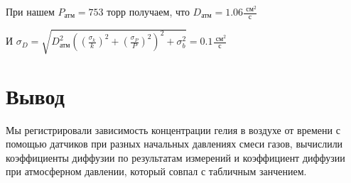 \documentclass[a4paper]{article}
\begin{document}
При нашем $P_\text{атм} = 753 \text{ торр}$ получаем, что $D_\text{атм} = 1.06 \frac{\text{ см}^2}{\text{с}}$

И $\sigma_D =\sqrt{ D_\text{атм}^2 ((\frac{\sigma_k}{k})^2 + (\frac{\sigma_P}{P})^2)^2 +  \sigma_b^2} = 0.1 \frac{\text{ см}^2}{\text{с}}$

\section{Вывод}

Мы регистрировали зависимость концентрации гелия в воздухе от времени с помощью датчиков при разных начальных давлениях смеси газов,  вычислили коэффициенты диффузии по результатам измерений и коэффициент диффузии при атмосферном давлении, который совпал с табличным занчением.
\end{document}
